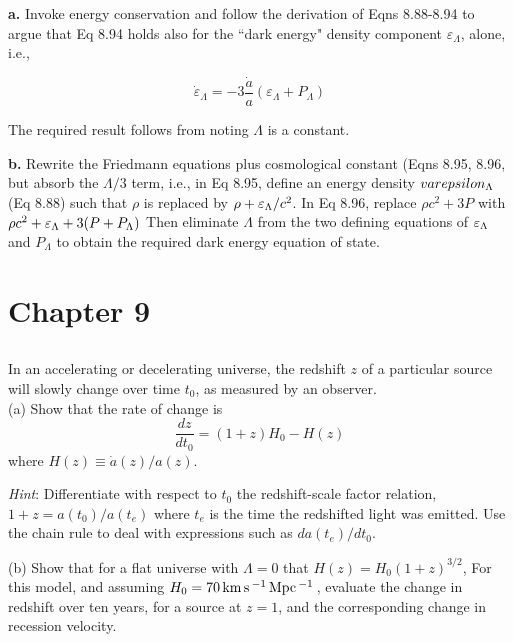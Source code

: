 \documentclass[12pt]{article}
\begin{document}
\textbf{a.} Invoke energy conservation and follow the derivation of Eqns 8.88-8.94 to argue that Eq 8.94 holds  also for the ``dark energy" density component \(\varepsilon_\Lambda\), alone, i.e.,

\[\dot{\varepsilon}_\Lambda = -3\frac{\dot{a}}{a}(\varepsilon_\Lambda + P_\Lambda)
\]

The required result follows from noting \(\Lambda\) is a constant. \newline

\textbf{b.} Rewrite the Friedmann equations plus cosmological constant (Eqns 8.95, 8.96, but absorb the \(\Lambda/3\) term, i.e., in Eq 8.95, define an energy density \(\\varepsilon_\Lambda\) (Eq 8.88) such that \(\rho\) is replaced by \(\rho + \varepsilon_\Lambda/c^2\). In Eq 8.96, replace  \(\rho c^2 + 3P\) with \(\rho c^2 + \varepsilon_\Lambda + 3(P+P_\Lambda) \) Then eliminate \(\Lambda\) from the two defining equations of \(\varepsilon_\Lambda\) and \(P_\Lambda\) to obtain the required dark energy equation of state.


\setcounter{section}{9}
\setcounter{subsection}{0}

\section*{Chapter 9}

\subsection{} %

In an accelerating or decelerating universe, the redshift \(z\) of a particular source will slowly change over time \(t_0\), as measured by an observer. \\


(a) Show that the rate of change is
\[\frac{dz}{dt_0} = (1+z)H_0-H(z)
\]
where \(H(z) \equiv \dot{a}(z)/a(z)\).

\textit{Hint}: Differentiate with respect to \(t_0\) the redshift-scale factor relation, \(1+z = a(t_0)/a(t_e)\) where \(t_e\) is the time the redshifted light was emitted. Use the chain rule to deal with expressions such as \(da(t_e)/dt_0\).

(b) Show that for a flat universe with \(\Lambda = 0\) that \(H(z) = H_0(1+z)^{3/2}\), For this model, and  assuming \(H_0 = 70\, \mathrm{km\,}\mathrm{s}\,^{-1}\,\mathrm{Mpc}\,^{-1}\,\), evaluate the change in redshift over ten years, for a source at \(z=1\), and the corresponding change in recession velocity.
\end{document}
